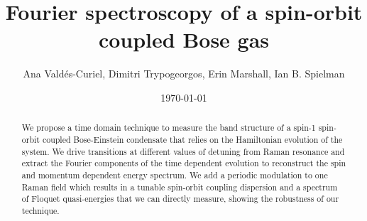 \documentclass{iopart}
\begin{document}
		
\title{Fourier spectroscopy of a spin-orbit coupled Bose gas}
	
\author{Ana Vald\'es-Curiel, Dimitri Trypogeorgos, Erin Marshall, Ian B. Spielman}
\address{Joint Quantum Institute, University of Maryland and National Institute of Standards and Technology, College Park, Maryland, 20742, USA}
\date{\today}

\begin{abstract}
	
	 We propose a time domain technique to measure the band structure of a spin-1 spin-orbit coupled Bose-Einstein condensate that relies on the Hamiltonian evolution of the system. We drive transitions at different values of detuning from Raman resonance and extract the Fourier components of the time dependent evolution to reconstruct the spin and momentum dependent energy spectrum. We add a periodic modulation to one Raman field which results in a tunable spin-orbit coupling dispersion and a spectrum of Floquet quasi-energies that we can directly measure, showing the robustness of our technique.  
\end{abstract}

\maketitle
\tableofcontents















 
\end{document}
